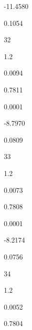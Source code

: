 \documentclass[a4paper,portrait,12pt]{article}
\begin{document}
-11.4580





0.1054





32





1.2





0.0094





0.7811





0.0001





-8.7970





0.0809





33





1.2





0.0073





0.7808





0.0001





-8.2174





0.0756





34





1.2





0.0052





0.7804
\end{document}
